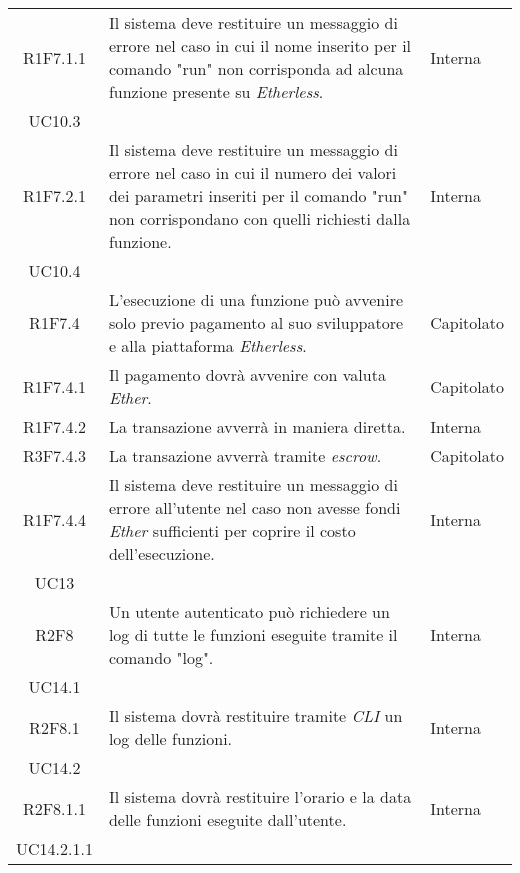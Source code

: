 \begin{longtable}{|c|p{8cm}|C{2cm}|}
	R1F7.1.1 &  Il sistema deve restituire un messaggio di errore nel caso in cui il nome inserito per il comando "run" non corrisponda ad alcuna funzione presente su \textit{Etherless}.  & \centering Interna \\ UC10.3 \tabularnewline

	R1F7.2.1 &  Il sistema deve restituire un messaggio di errore nel caso in cui il numero dei valori dei parametri inseriti per il comando "run" non corrispondano con quelli richiesti dalla funzione.  & \centering Interna \\ UC10.4 \tabularnewline

	R1F7.4 &  L'esecuzione di una funzione può avvenire solo previo pagamento al suo sviluppatore e alla piattaforma \textit{Etherless}. & Capitolato \\

	R1F7.4.1 &  Il pagamento dovrà avvenire con valuta \textit{Ether\glos}. & Capitolato \\

	R1F7.4.2 &  La transazione avverrà in maniera diretta. & Interna \\

	R3F7.4.3 &  La transazione avverrà tramite \textit{escrow\glos}. & Capitolato \\

	R1F7.4.4 &  Il sistema deve restituire un messaggio di errore all'utente nel caso non avesse fondi  \textit{Ether\glos} sufficienti per coprire il costo dell'esecuzione. & \centering Interna \\ UC13 \tabularnewline


	R2F8 &  Un utente autenticato può richiedere un log di tutte le funzioni eseguite tramite il comando "log". & \centering Interna \\ UC14.1 \tabularnewline

	R2F8.1 &  Il sistema dovrà restituire tramite \textit{CLI\glo} un log delle funzioni. & \centering Interna \\ UC14.2 \tabularnewline

	R2F8.1.1 &  Il sistema dovrà restituire l'orario e la data delle funzioni eseguite dall'utente. & \centering Interna \\ UC14.2.1.1 \tabularnewline


\end{longtable}
